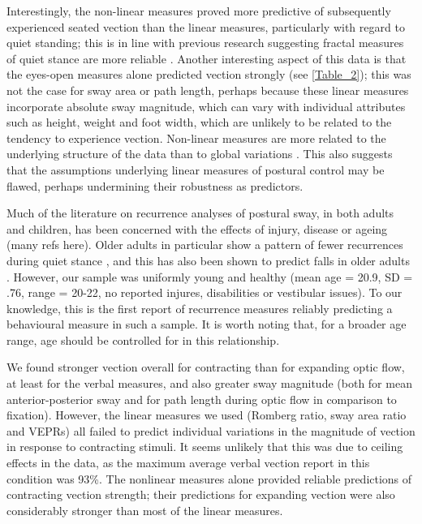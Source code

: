 \documentclass[11pt]{article}
\begin{document}
\begin{linenumbers}
Interestingly, the non-linear measures proved more predictive of subsequently experienced seated vection than the linear measures, particularly with regard to quiet standing; this is in line with previous research suggesting fractal measures of quiet stance are more reliable \cite{Doyle:2005fp}. Another interesting aspect of this data is that the eyes-open measures alone predicted vection strongly (see \ref{Table_2}); this was not the case for sway area or path length, perhaps because these linear measures incorporate absolute sway magnitude, which can vary with individual attributes such as height, weight and foot width, which are unlikely to be related to the tendency to experience vection. Non-linear measures are more related to the underlying structure of the data than to global variations \cite{Marwan:2007km, Riley:1999ug, Duarte:2000vh, Doyle:2005fp}. This also suggests that the assumptions underlying linear measures of postural control may be flawed, perhaps undermining their robustness as predictors. 


Much of the literature on recurrence analyses of postural sway, in both adults and children, has been concerned with the effects of injury, disease or ageing (many refs here). Older adults in particular show a pattern of fewer recurrences during quiet stance \cite{Tallon:2013vq}, and this has also been shown to predict falls in older adults \cite{Ramdani:2013da}. However, our sample was uniformly young and healthy (mean age = 20.9, SD = .76, range = 20-22, no reported injures, disabilities or vestibular issues). To our knowledge, this is the first report of recurrence measures reliably predicting a behavioural measure in such a sample. It is worth noting that, for a broader age range, age should be controlled for in this relationship. 

We found stronger vection overall for contracting than for expanding optic flow, at least for the verbal measures, and also greater sway magnitude (both for mean anterior-posterior sway and for path length during optic flow in comparison to fixation). However, the linear measures we used (Romberg ratio, sway area ratio and VEPRs) all failed to predict individual variations in the magnitude of vection in response to contracting stimuli. It seems unlikely that this was due to ceiling effects in the data, as the maximum average verbal vection report in this condition was 93\%. The nonlinear measures alone provided reliable predictions of contracting vection strength; their predictions for expanding vection were also considerably stronger than most of the linear measures. 


\end{linenumbers}
\end{document}
